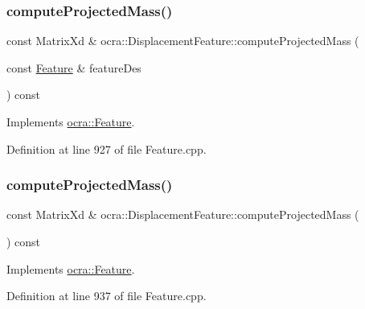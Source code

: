 \subsubsection{\texorpdfstring{compute\+Projected\+Mass()}{computeProjectedMass()}\hspace{0.1cm}{\footnotesize\ttfamily [1/2]}}
{\footnotesize\ttfamily const Matrix\+Xd \& ocra\+::\+Displacement\+Feature\+::compute\+Projected\+Mass (\begin{DoxyParamCaption}\item[{const \hyperlink{classocra_1_1Feature}{Feature} \&}]{feature\+Des }\end{DoxyParamCaption}) const\hspace{0.3cm}{\ttfamily [virtual]}}



Implements \hyperlink{classocra_1_1Feature_a44e11dd349e92971fefebff354e7214b}{ocra\+::\+Feature}.



Definition at line 927 of file Feature.\+cpp.

\hypertarget{classocra_1_1DisplacementFeature_a31902186d804823eea5ba0177ed85ced}{}\label{classocra_1_1DisplacementFeature_a31902186d804823eea5ba0177ed85ced} 
\subsubsection{\texorpdfstring{compute\+Projected\+Mass()}{computeProjectedMass()}\hspace{0.1cm}{\footnotesize\ttfamily [2/2]}}
{\footnotesize\ttfamily const Matrix\+Xd \& ocra\+::\+Displacement\+Feature\+::compute\+Projected\+Mass (\begin{DoxyParamCaption}{ }\end{DoxyParamCaption}) const\hspace{0.3cm}{\ttfamily [virtual]}}



Implements \hyperlink{classocra_1_1Feature_a99ac023809c0cf34b5d582537934b08c}{ocra\+::\+Feature}.



Definition at line 937 of file Feature.\+cpp.

\hypertarget{classocra_1_1DisplacementFeature_a4b2e46d41b46c9af72f21f6dcdeec5f5}{}\label{classocra_1_1DisplacementFeature_a4b2e46d41b46c9af72f21f6dcdeec5f5} 
